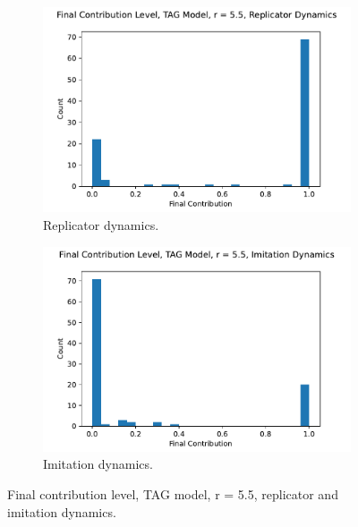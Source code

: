\FloatBarrier 
\begin{figure}[!h]
  \begin{subfigure}[b]{0.45\textwidth}
    \includegraphics[width=1.1\textwidth]{images/Rep_coop_histo_TAG_55.pdf}
    \caption{Replicator dynamics. }
    \label{Rep_TAG_55_coop_histo}
  \end{subfigure}
  \hfill
  \begin{subfigure}[b]{0.45\textwidth}
    \includegraphics[width=1.1\textwidth]{images/ID_coop_histo_TAG_55.pdf}
    \caption{Imitation dynamics. }
    \label{ID_TAG_55_coop_histo}
  \end{subfigure}
  \caption{Final contribution level, TAG model, r = 5.5, replicator and imitation dynamics. } \label{coop_histo_TAG}
\end{figure} 
\FloatBarrier

